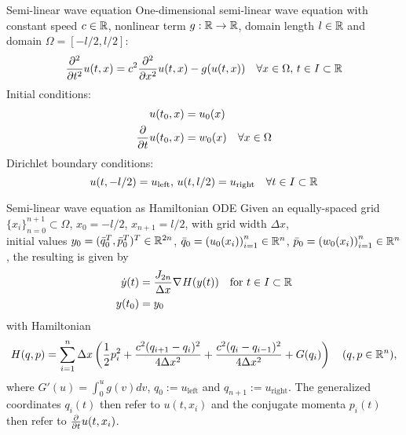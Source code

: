 \begin{frame}{Semi-linear wave equation}
    One-dimensional semi-linear wave equation with constant speed $c \in \mathbb{R}$, nonlinear term 
    $g : \mathbb{R} \to \mathbb{R}$, domain length $l \in \mathbb{R}$ and domain $\Omega = [-l/2, l/2]$:
    \begin{equation*}
      \frac{\partial^2}{\partial t^2} u(t,x) = 
      c^2 \frac{\partial^2}{\partial x^2} u(t,x) - g(u(t,x)) 
      \quad \forall x \in \Omega, 
      \, t \in I \subset \mathbb{R}
    \end{equation*}
    Initial conditions:
    \begin{align*}
      u(t_0,x) &= u_0(x) \\
      \frac{\partial }{\partial t} u(t_0,x) &= w_0(x) \quad \forall x \in \Omega
    \end{align*}
    Dirichlet boundary conditions:
    \begin{equation*}
      u(t,-l/2) = u_{\text{left}}, \, u(t,l/2) = u_{\text{right}} \quad \forall t \in I \subset \mathbb{R}
    \end{equation*}
  \end{frame}
  
  \begin{frame}{Semi-linear wave equation as Hamiltonian ODE}
    Given an equally-spaced grid $\{ x_i \}_{n=0}^{n+1} \subset \Omega$, $x_0 = -l/2$, $x_{n+1} = l/2$,
    with grid width $\Delta x$,\\
    initial values $y_0 = (\bar{q}_0^T, \bar{p}_0^T)^T \in \mathbb{R}^{2n}$, $\bar{q}_0 = \left( u_0(x_i) \right)_{i=1}^n \in \mathbb{R}^n$, 
    $\bar{p}_0 = \left( w_0(x_i) \right)_{i=1}^n \in \mathbb{R}^n$,
    the resulting  is given by
    \begin{align*}
      \dot{y}(t) &= \frac{J_{2n}}{\Delta x} \nabla_{}{H}(y(t)) \quad \text{for } t \in I \subset \mathbb{R} \\
      y(t_0) &= y_0
    \end{align*}
    with Hamiltonian
    \begin{equation*}
      H(q,p) = \sum_{i=1}^n \Delta x \left( 
      \frac{1}{2} p_i^2 + \frac{c^2 (q_{i+1} - q_i)^2}{4 \Delta x^2} 
      + \frac{c^2 (q_i - q_{i-1})^2}{4 \Delta x^2} + G(q_i)
      \right)
      \quad (q,p \in \mathbb{R}^n)
      ,
    \end{equation*}
    where $G'(u) = \int_0^u g(v) dv$, $q_0 := u_{\text{left}}$ and $q_{n+1} := u_{\text{right}}$.
    The generalized coordinates $q_i(t)$ then refer to $u(t,x_i)$ and 
    the conjugate momenta $p_i(t)$ then refer to $\frac{\partial }{\partial t} u(t,x_i)$.
  \end{frame}